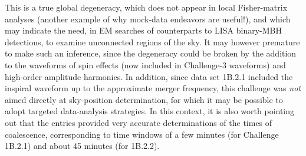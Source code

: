 \documentclass{iopart}
\begin{document}
This is a true global degeneracy, which does not appear in local Fisher-matrix analyses (another example of why mock-data endeavors are useful!), and which may indicate the need, in EM searches of counterparts to LISA binary-MBH detections, to examine unconnected regions of the sky. It may however premature to make such an inference, since the degeneracy could be broken by the addition to the waveforms of spin effects (now included in Challenge-3 waveforms) and high-order amplitude harmonics. In addition, since data set 1B.2.1 included the inspiral waveform up to the approximate merger frequency, this challenge was \emph{not} aimed directly at sky-position determination, for which it may be possible to adopt targeted data-analysis strategies.
In this context, it is also worth pointing out that the entries provided very accurate determinations of the times of coalescence, corresponding to time windows of a few minutes (for Challenge 1B.2.1) and about 45 minutes (for 1B.2.2).
\end{document}
